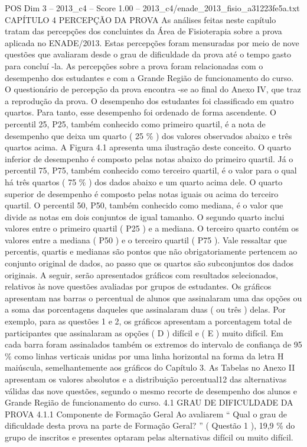 \begin{textsample}{POS Dim 3 – 2013\_c4 – Score 1.00 – 2013\_c4/enade\_2013\_fisio\_a31223fe5a.txt}  \label{ex:f3_pos_166}
CAPÍTULO 4 PERCEPÇÃO DA PROVA As análises feitas neste capítulo tratam das percepções dos concluintes da Área de Fisioterapia sobre a prova aplicada no ENADE/2013.
Estas percepções foram mensuradas por meio de nove questões que avaliaram desde o grau de dificuldade da prova até o tempo gasto para concluí -la.
As percepções sobre a prova foram relacionadas com o desempenho dos estudantes e com a Grande Região de funcionamento do curso.
O questionário de percepção da prova encontra -se ao final do Anexo IV, que traz a reprodução da prova.
O desempenho dos estudantes foi classificado em quatro quartos.
Para tanto, esse desempenho foi ordenado de forma ascendente.
O percentil 25, P25, também conhecido como primeiro quartil, é a nota de desempenho que deixa um quarto ( 25 \% ) dos valores observados abaixo e três quartos acima.
A Figura 4.1 apresenta uma ilustração deste conceito.
O quarto inferior de desempenho é composto pelas notas abaixo do primeiro quartil.
Já o percentil 75, P75, também conhecido como terceiro quartil, é o valor para o qual há três quartos ( 75 \% ) dos dados abaixo e um quarto acima dele.
O quarto superior de desempenho é composto pelas notas iguais ou acima do terceiro quartil.
O percentil 50, P50, também conhecido como mediana, é o valor que divide as notas em dois conjuntos de igual tamanho.
O segundo quarto inclui valores entre o primeiro quartil ( P25 ) e a mediana.
O terceiro quarto contém os valores entre a mediana ( P50 ) e o terceiro quartil ( P75 ).
Vale ressaltar que percentis, quartis e medianas são pontos que não obrigatoriamente pertencem ao conjunto original de dados, ao passo que os quartos são subconjuntos dos dados originais.
A seguir, serão apresentados gráficos com resultados selecionados, relativos às nove questões avaliadas por grupos de estudantes.
Os gráficos apresentam nas barras o percentual de alunos que assinalaram uma das opções ou a soma das porcentagens daqueles que assinalaram duas ( ou três ) delas.
Por exemplo, para as questões 1 e 2, os gráficos apresentam a porcentagem total de participantes que assinalaram as opções ( D ) difícil e ( E ) muito difícil.
Em cada barra foram assinalados também os extremos do intervalo de confiança de 95 \% como linhas verticais unidas por uma linha horizontal na forma da letra H maiúscula, semelhantemente aos gráficos do Capítulo 3.
As Tabelas no Anexo II apresentam os valores absolutos e a distribuição percentual12 das alternativas válidas das nove questões, segundo o mesmo recorte de desempenho dos alunos e Grande Região de funcionamento do curso. 4.1 GRAU DE DIFICULDADE DA PROVA 4.1.1 Componente de Formação Geral Ao avaliarem “ Qual o grau de dificuldade desta prova na parte de Formação Geral? ” ( Questão 1 ), 19,9 \% do grupo de inscritos e presentes optaram pelas alternativas difícil ou muito difícil.

\end{textsample}

